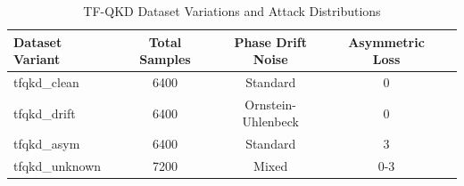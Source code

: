 \begin{table}[htbp]
\centering
\caption{TF-QKD Dataset Variations and Attack Distributions}
\label{tab:dataset_params}
\begin{tabular}{@{}lcccc@{}}
\toprule
\textbf{Dataset Variant} & \textbf{Total Samples} & \textbf{Phase Drift Noise} & \textbf{Asymmetric Loss} \\ \midrule
tfqkd\_clean & 6400 & Standard & 0 \\
tfqkd\_drift & 6400 & Ornstein-Uhlenbeck & 0 \\
tfqkd\_asym & 6400 & Standard & 3 \\
tfqkd\_unknown & 7200 & Mixed & 0-3 \\
\bottomrule
\end{tabular}
\end{table}
